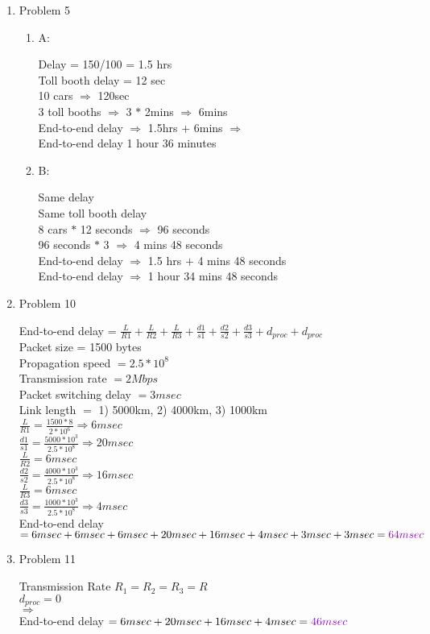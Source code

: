 \documentclass{article}
\begin{document}
\begin{enumerate}
	\item Problem 5 \\
	\begin{enumerate}
		\item A: \\
			\raggedright{Delay = 150/100 = 1.5 hrs\\
			Toll booth delay = 12 sec\\
			10 cars $\Rightarrow$  120sec\\
			3 toll booths $\Rightarrow$ 3 $*$ 2mins $\Rightarrow$  6mins\\
			End-to-end delay $\Rightarrow$ 1.5hrs + 6mins $\Rightarrow$ \\
			\textcolor{mauve}{End-to-end delay 1 hour 36 minutes}\\}
		\item B: \\
			\raggedright{Same delay\\
			Same toll booth delay\\
			8 cars $*$ 12 seconds $\Rightarrow$ 96 seconds\\
			96 seconds $*$ 3 $\Rightarrow$ 4 mins 48 seconds\\
			End-to-end delay $\Rightarrow$ 1.5 hrs $+$ 4 mins 48 seconds\\
			\textcolor{mauve}{End-to-end delay $\Rightarrow$ 1 hour 34 mins 48 seconds}\\}
	\end{enumerate}
	\item Problem 10\\
		\raggedright{
			End-to-end delay = $\frac{L}{R1}+\frac{L}{R2}+\frac{L}{R3}+
								\frac{d1}{s1}+\frac{d2}{s2}+\frac{d3}{s3}+
								d_{proc}+d_{proc}$ \\
			Packet size = 1500 bytes\\
			Propagation speed $= 2.5 * 10^{8}$\\
			Transmission rate $= 2Mbps$\\
			Packet switching delay $= 3msec$\\
			Link length $=$ 1) 5000km, 2) 4000km, 3) 1000km\\
			$\frac{L}{R1} = \frac{1500*8}{2*10^{6}} \Rightarrow 6 msec$\\
			$\frac{d1}{s1} = \frac{5000*10^{3}}{2.5*10^{8}} \Rightarrow 20 msec$\\
			$\frac{L}{R2} = 6msec$\\
			$\frac{d2}{s2} = \frac{4000*10^{3}}{2.5*10^{8}} \Rightarrow 16 msec$\\
			$\frac{L}{R3} = 6msec$\\
			$\frac{d3}{s3} = \frac{1000*10^{3}}{2.5*10^{8}} \Rightarrow  4 msec$\\
			End-to-end delay $= 6msec+6msec+6msec+20msec+16msec+4msec+3msec+3msec= \textcolor{mauve}{64msec}$\\
		}

	\item Problem 11\\
		\raggedright{
			Transmission Rate $R_{1} = R_{2} = R_{3} = R$ \\
			$d_{proc} = 0$\\
			$\Rightarrow$\\
			End-to-end delay $= 6msec + 20msec + 16msec + 4msec = \textcolor{mauve}{ 46msec}$\\
			}
			
\end{enumerate}
\end{document}
